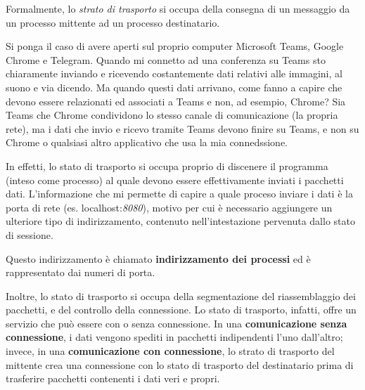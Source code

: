             Formalmente, lo \textit{strato di trasporto} si occupa della consegna di un messaggio da un processo mittente ad un processo destinatario. 
            
            \vspace{3mm}
            
            Si ponga il caso di avere aperti sul proprio computer Microsoft Teams, Google Chrome e Telegram. Quando mi connetto ad una conferenza su Teams sto chiaramente inviando e ricevendo costantemente dati relativi alle immagini, al suono e via dicendo. Ma quando questi dati arrivano, come fanno a capire che devono essere relazionati ed associati a Teams e non, ad esempio, Chrome? Sia Teams che Chrome condividono lo stesso canale di comunicazione (la propria rete), ma i dati che invio e ricevo tramite Teams devono finire su Teams, e non su Chrome o qualsiasi altro applicativo che usa la mia connedssione.
            
            \vspace{3mm}
            
            In effetti, lo stato di trasporto si occupa proprio di discenere il programma (inteso come processo) al quale devono essere effettivamente inviati i pacchetti dati. L'informazione che mi permette di capire a quale proceso inviare i dati è la porta di rete (es. localhost:\textit{8080}), motivo per cui è necessario aggiungere un ulteriore tipo di indirizzamento, contenuto nell'intestazione pervenuta dallo stato di sessione.
            
            \vspace{3mm}
            
            Questo indirizzamento è chiamato \textbf{indirizzamento dei processi} ed è rappresentato dai numeri di porta.
            
            \vspace{3mm}
            
            Inoltre, lo stato di trasporto si occupa della segmentazione del riassemblaggio dei pacchetti, e del controllo della connessione. Lo stato di trasporto, infatti, offre un servizio che può essere con o senza connessione. In una \textbf{comunicazione senza connessione}, i dati vengono spediti in pacchetti indipendenti l'uno dall'altro; invece, in una \textbf{comunicazione con connessione}, lo strato di trasporto del mittente crea una connessione con lo stato di trasporto del destinatario prima di trasferire pacchetti contenenti i dati veri e propri.
            
